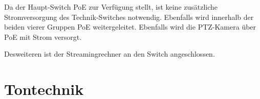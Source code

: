 		Da der Haupt-Switch \Gls{PoE} zur Verfügung stellt, ist keine zusätzliche Stromversorgung des Technik-Switches notwendig.
		Ebenfalls wird innerhalb der beiden vierer Gruppen \Gls{PoE} weitergeleitet.
		Ebenfalls wird die \Gls{PTZ-Kamera} über \Gls{PoE} mit Strom versorgt.

		Desweiteren ist der Streamingrechner an den Switch angeschlossen.

	\section{Tontechnik}
		